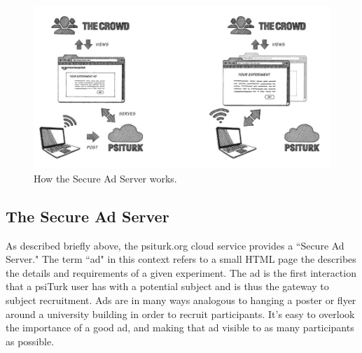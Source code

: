 \documentclass[twocolumn]{svjour3}          %
\begin{document}
\begin{figure}[tp]
\centering
\includegraphics[scale=.40]{figures/psiturk_cloud_sequence.jpg}
\caption{How the Secure Ad Server works.}
\label{fig:adserver}
\end{figure}


\subsection{The Secure Ad Server}

As described briefly above, the psiturk.org cloud service
provides a ``Secure Ad Server."  The term ``ad" in this context
refers to a small HTML page the describes the details and
requirements of a given experiment.  The ad is the
first interaction that a \textsf{psiTurk} user has with a
potential subject and is thus the gateway to subject recruitment.
Ads are in many ways analogous to hanging a poster or flyer 
around a university building in order to recruit participants.
It's easy to overlook the importance of a good ad, and making that ad
visible to as many participants as possible.
\end{document}
